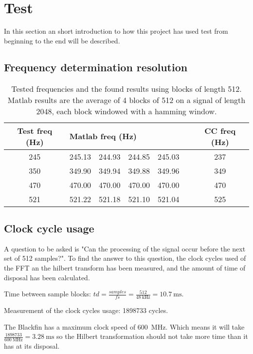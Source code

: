 
\section{Test}
\label{sec:test}
In this section an short introduction to how this project has used test from beginning to the end will be described.
\subsection{Frequency determination resolution}
\begin{table}
	\centering
	\begin{tabular}{c | c c c c c | c}
		\toprule
		Test freq (Hz) & \multicolumn{4}{l}{Matlab freq (Hz)} & & CC freq (Hz) \\
		\midrule
		\num{245} & \num{245.13} & \num{244.93} & \num{244.85} & \num{245.03} && \num{237}\\
		\num{350} & \num{349.90} & \num{349.94} & \num{349.88} & \num{349.96} && \num{349}\\
		\num{470} & \num{470.00} & \num{470.00} & \num{470.00} & \num{470.00} && \num{470} \\
		\num{521} & \num{521.22} & \num{521.18} & \num{521.10} & \num{521.04} && \num{525} \\
		\bottomrule
	\end{tabular}
	\caption{Tested frequencies and the found results using blocks of length \num{512}. Matlab results are the average of 4 blocks of \num{512} on a signal of length \num{2048}, each block windowed with a hamming window.}
	\label{tab:test}
\end{table}

\subsection{Clock cycle usage}
A question to be asked is "Can the processing of the signal occur before the next set of 512 samples?".
To find the answer to this question, the clock cycles used of the FFT an the hilbert transform has been measured, and the amount of time of disposal has been calculated.

Time between sample blocks: 
$td = \frac{samples}{fs} = \frac{512}{\SI{48}{\kilo\hertz}} = \SI{10.7}{\milli\second}$.

Measurement of the clock cycles usage: 
\num{1898733} cycles.

The Blackfin has a maximum clock speed of \SI{600}{\mega\hertz}.
Which means it will take $\frac{\num{1898733}}{\SI{600}{\mega\hertz}} = {\SI{3.28}{\milli\second}}$ so the Hilbert transformation should not take more time than it has at its disposal.



\FloatBarrier